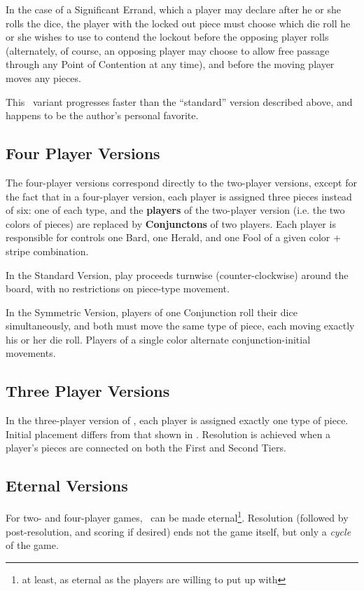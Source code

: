   In the case of a Significant Errand, which a player may declare after he or she
  rolls the dice, the player with the locked out piece must choose which die roll
  he or she wishes to use to contend the lockout before the opposing player rolls
  (alternately, of course, an opposing player may choose to allow free passage
  through any Point of Contention at any time), and before the moving player moves
  any pieces.

  This \know\ variant progresses faster than the ``standard'' version
  described above, and happens to be the author's personal favorite.

\subsection{Four Player Versions}\label{4player}

  The four-player versions correspond directly to the two-player versions,
  except for the fact that in a four-player version, each player is assigned
  three pieces instead of six: one of each type, and the {\bf players} of the
  two-player version (i.e. the two colors of pieces) are replaced by
  {\bf Conjunctons} of two players.  Each player is responsible for
  controls one Bard, one Herald, and one Fool of a given
  color + stripe combination.

  In the Standard Version, play proceeds turnwise (counter-clockwise) around
  the board, with no restrictions on piece-type movement.

  In the Symmetric Version, players of one Conjunction roll their dice simultaneously, and
  both must move the same type of piece, each moving exactly his or her die roll.
  Players of a single color alternate conjunction-initial movements.

\subsection{Three Player Versions}\label{3player}

In the three-player version of \know, each player is assigned exactly one
type of piece.  Initial placement differs from that shown in
.  Resolution is achieved when a player's pieces
are connected on both the First and Second Tiers.


\subsection{Eternal Versions}\label{eternal}
  For two- and four-player games, \know\ can be made
  eternal\footnote{
    at least, as eternal as the players are willing to put up with
    }.
  Resolution (followed by post-resolution, and scoring if desired)
  ends not the game itself, but only a {\sl cycle}
  of the game.

